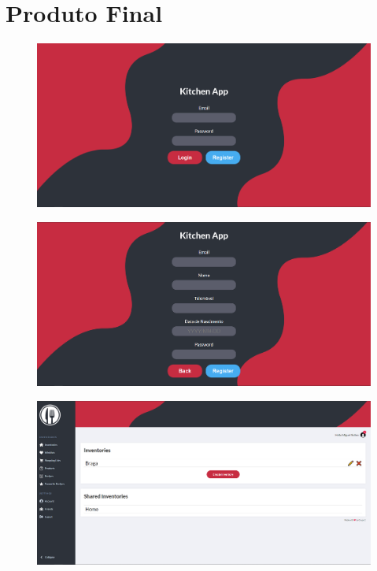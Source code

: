 \documentclass[a4paper]{report}
\begin{document}
\chapter{Produto Final}
    \begin{figure}[H]
        \centering
            \includegraphics[width=\textwidth]{images/produto_final/login.png}
    \end{figure}

    \begin{figure}[H]
        \centering
            \includegraphics[width=\textwidth]{images/produto_final/registo.png}
    \end{figure}

    \begin{figure}[H]
        \centering
            \includegraphics[width=\textwidth]{images/produto_final/inicial.png}
    \end{figure}
\end{document}
